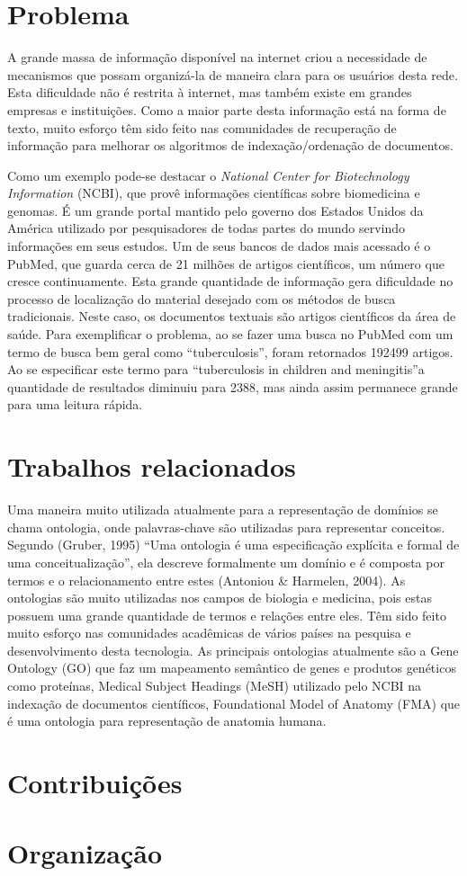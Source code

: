 \section{Problema}
A grande massa de informação disponível na internet criou a necessidade de mecanismos que possam organizá-la de maneira clara para os usuários desta rede. Esta dificuldade não é restrita à internet, mas também existe em grandes empresas e instituições. Como a maior parte desta informação está na forma de texto, muito esforço têm sido feito nas comunidades de recuperação de informação para melhorar os algoritmos de indexação/ordenação de documentos.

Como um exemplo pode-se destacar o \emph{National Center for Biotechnology Information} (NCBI), que provê informações científicas sobre biomedicina e genomas. É um grande portal mantido pelo governo dos Estados Unidos da América utilizado por pesquisadores de todas partes do mundo servindo informações em seus estudos. Um de seus bancos de dados mais acessado é o PubMed, que guarda cerca de 21 milhões de artigos científicos, um número que cresce continuamente. Esta grande quantidade de informação gera dificuldade no processo de localização do material desejado com os métodos de busca tradicionais. Neste caso, os documentos textuais são artigos científicos da área de saúde. Para exemplificar o problema, ao se fazer uma busca no PubMed com um termo de busca bem geral como “tuberculosis”, foram retornados 192499 artigos. Ao se especificar este termo para “tuberculosis in children and meningitis”a quantidade de resultados diminuiu para 2388, mas ainda assim permanece grande para uma leitura rápida.

\section{Trabalhos relacionados}
Uma maneira muito utilizada atualmente para a representação de domínios se chama ontologia, onde palavras-chave são utilizadas para representar conceitos. Segundo (Gruber, 1995) “Uma ontologia é uma especificação explícita e formal de uma conceitualização”, ela descreve formalmente um domínio e é composta por termos e o relacionamento entre estes (Antoniou \& Harmelen, 2004). As ontologias são muito utilizadas nos campos de biologia e medicina, pois estas possuem uma grande quantidade de termos e relações entre eles. Têm sido feito muito esforço nas comunidades acadêmicas de vários países na pesquisa e desenvolvimento desta tecnologia. As principais ontologias atualmente são a Gene Ontology (GO) que faz um mapeamento semântico de genes e produtos genéticos como proteínas, Medical Subject Headings (MeSH) utilizado pelo NCBI na indexação de documentos científicos, Foundational Model of Anatomy (FMA) que é uma ontologia para representação de anatomia humana.
\section{Contribuições}
\section{Organização}

